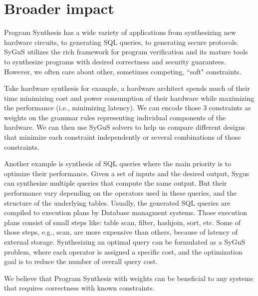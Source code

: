 \section{Broader impact}
\label{sec:impact}
Program Synthesis has a wide variety of applications from synthesizing new hardware circuits, to generating SQL queries, to generating secure protocols.
%
SyGuS utilizes the rich framework for program verification and its mature tools to synthesize programs with desired correctness and security guarantees.
%
However, we often care about other, sometimes competing, ``soft" constraints.
%

Take hardware synthesis for example, a hardware architect spends much of their time minimizing cost and power consumption of their hardware while maximizing the performance (i.e., minimizing latency).
%
We can encode those 3 constraints as weights on the grammar rules representing individual components of the hardware.
%
We can then use SyGuS solvers to help us compare different designs that minimize each constraint independently or several combinations of those constraints.
%

Another example is synthesis of SQL queries where the main priority is to optimize their performance.
%
Given a set of inputs and the desired output, Sygus can synthesize multiple queries that compute the same output.  
%
But their performance vary depending on the operators used in these queries, and the structure of the underlying tables. 
%
Usually, the generated SQL queries are compiled to execution plans by Database managment systems.
%
Those execution plans consist of small steps like: table scan, filter, hashjoin, sort, etc.
%
Some of those steps, e.g., scan, are more expensive than others, because of latency of external storage.
%
Synthesizing an optimal query can be formulated as a SyGuS problem, where each operator is assigned a specific cost, and the optimization goal is to reduce the number of overall query cost.
%

We believe that Program Synthesis with weights can be beneficial to any systems that requires correctness with known constraints.
